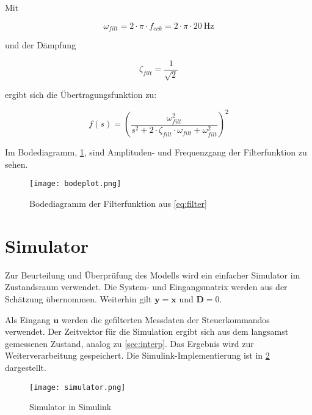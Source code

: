 Mit

\begin{equation}
	\omega_{filt} = 2 \cdot \pi \cdot f_{eck} = 2 \cdot \pi \cdot \SI{20}{\hertz}
\end{equation}


und der Dämpfung

\begin{equation}
	\zeta_{filt} = \frac{1}{\sqrt{2}}
\end{equation}

ergibt sich die Übertragungsfunktion zu:

\begin{equation} \label{eq:filter}
	f(s) = \left(\frac{\omega_{filt}^2}{s^2+2 \cdot \zeta_{filt} \cdot \omega_{filt} +\omega_{filt}^2}\right)^2
\end{equation}

Im Bodediagramm, \cref{fig:bodeplot}, sind Amplituden- und Frequenzgang der Filterfunktion zu sehen.

\begin{figure}[h!]
	\centering
	\texttt{[image: bodeplot.png]}
	\caption{Bodediagramm der Filterfunktion aus \cref{eq:filter}}
	\label{fig:bodeplot}
\end{figure}

\section{Simulator}

Zur Beurteilung und Überprüfung des Modells wird ein einfacher Simulator im 
Zustandsraum verwendet. Die System- und Eingangsmatrix werden aus der Schätzung 
übernommen. Weiterhin gilt $\mathbf{y}=\mathbf{x}$ und $\textbf{D}=0$.

Als Eingang $\textbf{u}$ werden die gefilterten Messdaten der Steuerkommandos 
verwendet. Der Zeitvektor für die Simulation ergibt sich aus dem langsamst 
gemessenen Zustand, analog zu \cref{sec:interp}. Das Ergebnis wird zur 
Weiterverarbeitung gespeichert.
Die Simulink-Implementierung ist in \cref{fig:simulator} dargestellt.

\begin{figure}[h!]
	\centering
	\texttt{[image: simulator.png]}
	\caption{Simulator in Simulink}
	\label{fig:simulator}
\end{figure}
